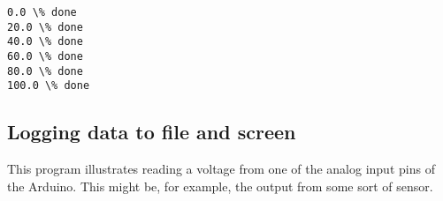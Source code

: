 \documentclass[10pt]{article}
\begin{document}
    \begin{Verbatim}[commandchars=\\\{\}]
0.0 \% done
20.0 \% done
40.0 \% done
60.0 \% done
80.0 \% done
100.0 \% done

    \end{Verbatim}

    \hypertarget{a.7-logging-data-to-file-and-screen}{%
\subsection{Logging data to file and
screen}\label{a.7-logging-data-to-file-and-screen}}

This program illustrates reading a voltage from one of the analog input
pins of the Arduino. This might be, for example, the output from some
sort of sensor.
\end{document}
